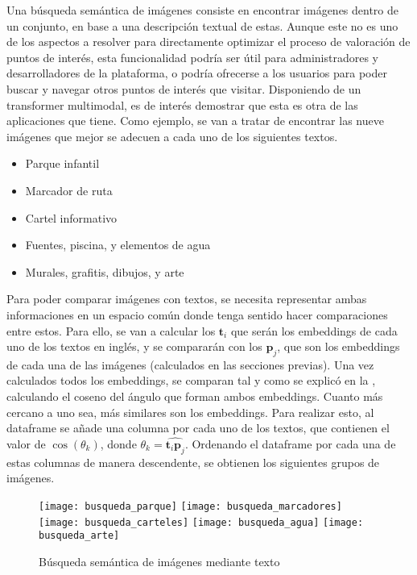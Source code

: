  		Una búsqueda semántica de imágenes consiste en encontrar imágenes dentro de un conjunto, en base a una descripción textual de estas. Aunque este no es uno de los aspectos a resolver para directamente optimizar el proceso de valoración de puntos de interés, esta funcionalidad podría ser útil para administradores y desarrolladores de la plataforma, o podría ofrecerse a los usuarios para poder buscar y navegar otros puntos de interés que visitar. Disponiendo de un transformer multimodal, es de interés demostrar que esta es otra de las aplicaciones que tiene. Como ejemplo, se van a tratar de encontrar las nueve imágenes que mejor se adecuen a cada uno de los siguientes textos. 
 		
 		\begin{itemize}
 			\item Parque infantil
 			\item Marcador de ruta
 			\item Cartel informativo
 			\item Fuentes, piscina, y elementos de agua
 			\item Murales, grafitis, dibujos, y arte
 		\end{itemize}
 		
 		Para poder comparar imágenes con textos, se necesita representar ambas informaciones en un espacio común donde tenga sentido hacer comparaciones entre estos. Para ello, se van a calcular los $\textbf{t}_i$ que serán los embeddings de cada uno de los textos en inglés, y se compararán con los $\textbf{p}_j$, que son los embeddings de cada una de las imágenes (calculados en las secciones previas). Una vez calculados todos los embeddings, se comparan tal y como se explicó en la , calculando el coseno del ángulo que forman ambos embeddings. Cuanto más cercano a uno sea, más similares son los embeddings. Para realizar esto, al dataframe se añade una columna por cada uno de los textos, que contienen el valor de $\cos(\theta_k)$, donde $\theta_k = \widehat{\textbf{t}_i\textbf{p}_j}$. Ordenando el dataframe por cada una de estas columnas de manera descendente, se obtienen los siguientes grupos de imágenes. \\
 		
 		\begin{figure}[!h]
 			\centering
 			\texttt{[image: busqueda\_parque]}\hfill
 			\texttt{[image: busqueda\_marcadores]}\hfill
 			\texttt{[image: busqueda\_carteles]}\vspace{.7cm}
 			\texttt{[image: busqueda\_agua]}\hspace{.7cm}
 			\texttt{[image: busqueda\_arte]}
 			\caption{Búsqueda semántica de imágenes mediante texto}
 			\label{fig:busqueda_semantica}
 		\end{figure} 
 		
